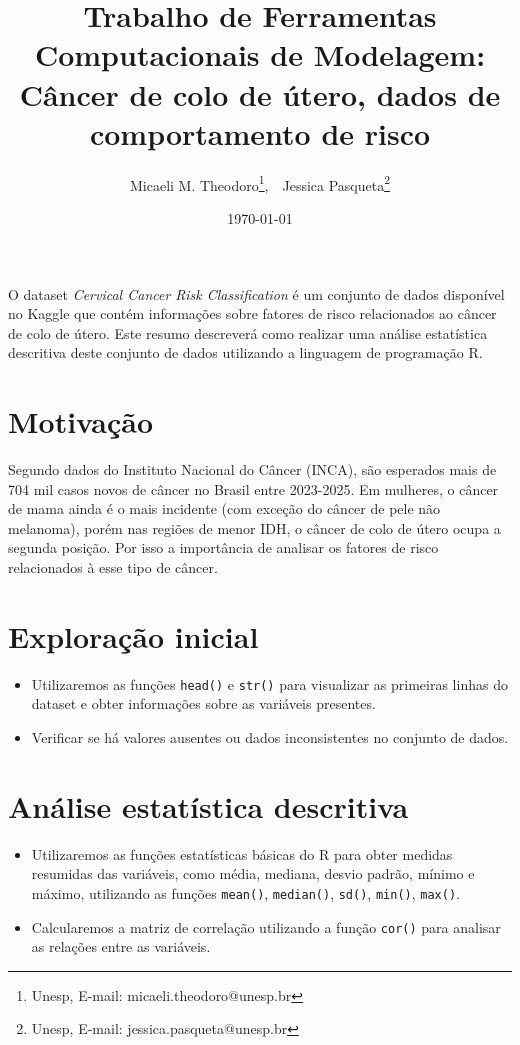 \documentclass[12pt, 
oneside,		  
a4paper,			
english,			
brazil				 
]{article}
\title{Trabalho de Ferramentas Computacionais de Modelagem:\\ Câncer de colo de útero, dados de comportamento de risco}
\author{Micaeli M. Theodoro\footnote{Unesp, E-mail: micaeli.theodoro@unesp.br}, \,\, Jessica Pasqueta\footnote{Unesp, E-mail: jessica.pasqueta@unesp.br}}
\date{\today}
\begin{document}
\maketitle
O dataset \textit{Cervical Cancer Risk Classification} é um conjunto de dados disponível no Kaggle que contém informações sobre fatores de risco relacionados ao câncer de colo de útero. Este resumo descreverá como realizar uma análise estatística descritiva deste conjunto de dados utilizando a linguagem de programação R.

\section{Motivação}

Segundo dados do Instituto Nacional do Câncer (INCA), são esperados mais de 704 mil casos novos de câncer no Brasil entre 2023-2025. Em mulheres, o câncer de mama ainda é o mais incidente (com exceção do câncer de pele não melanoma), porém nas regiões de menor IDH, o câncer de colo de útero ocupa a segunda posição.
Por isso a importância de analisar os fatores de risco relacionados à esse tipo de câncer.

\section{Exploração inicial}

\begin{itemize}
\item Utilizaremos as funções \texttt{head()} e \texttt{str()} para visualizar as primeiras linhas do dataset e obter informações sobre as variáveis presentes.
\item Verificar se há valores ausentes ou dados inconsistentes no conjunto de dados.
\end{itemize}

\section{Análise estatística descritiva}

\begin{itemize}
\item Utilizaremos as funções estatísticas básicas do R para obter medidas resumidas das variáveis, como média, mediana, desvio padrão, mínimo e máximo, utilizando as funções \texttt{mean()}, \texttt{median()}, \texttt{sd()}, \texttt{min()}, \texttt{max()}.
\item Calcularemos a matriz de correlação utilizando a função \texttt{cor()} para analisar as relações entre as variáveis.
\end{itemize}
\end{document}
